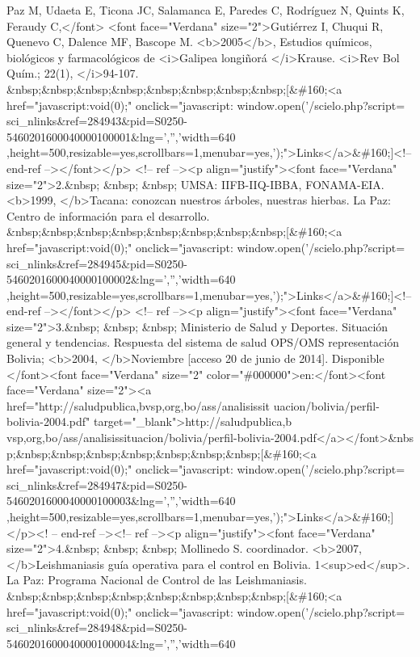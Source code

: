 Paz M, Udaeta E, Ticona JC, Salamanca E, Paredes C, Rodríguez N, Quints K,
Feraudy C,</font> <font face="Verdana" size="2">Gutiérrez I, Chuqui R, Quenevo
C, Dalence MF, Bascope M. <b>2005</b>, Estudios químicos, biológicos y
farmacológicos de <i>Galipea longiñorá </i>Krause. <i>Rev Bol Quím.; 22(1),
</i>94-107. \&nbsp;\&nbsp;\&nbsp;\&nbsp;\&nbsp;\&nbsp;\&nbsp;\&nbsp;[\&\#160;<a
href="javascript:void(0);" onclick="javascript: window.open('/scielo.php?script=
sci\_{}nlinks\&ref=284943\&pid=S0250-5460201600040000100001\&lng=','','width=640
,height=500,resizable=yes,scrollbars=1,menubar=yes,');">Links</a>\&\#160;]<!--
end-ref --></font></p> <!-- ref --><p align="justify"><font face="Verdana"
size="2">2.\&nbsp; \&nbsp; \&nbsp; UMSA: IIFB-IIQ-IBBA, FONAMA-EIA. <b>1999,
</b>Tacana: conozcan nuestros árboles, nuestras hierbas. La Paz: Centro de
información para el desarrollo.
\&nbsp;\&nbsp;\&nbsp;\&nbsp;\&nbsp;\&nbsp;\&nbsp;\&nbsp;[\&\#160;<a
href="javascript:void(0);" onclick="javascript: window.open('/scielo.php?script=
sci\_{}nlinks\&ref=284945\&pid=S0250-5460201600040000100002\&lng=','','width=640
,height=500,resizable=yes,scrollbars=1,menubar=yes,');">Links</a>\&\#160;]<!--
end-ref --></font></p> <!-- ref --><p align="justify"><font face="Verdana"
size="2">3.\&nbsp; \&nbsp; \&nbsp; Ministerio de Salud y Deportes. Situación
general y tendencias. Respuesta del sistema de salud OPS/OMS representación
Bolivia; <b>2004, </b>Noviembre [acceso 20 de junio de 2014]. Disponible
</font><font face="Verdana" size="2" color="\#000000">en:</font><font
face="Verdana" size="2"><a href="http://saludpublica,bvsp,org,bo/ass/analisissit
uacion/bolivia/perfil-bolivia-2004.pdf" target="\_{}blank">http://saludpublica,b
vsp,org,bo/ass/analisissituacion/bolivia/perfil-bolivia-2004.pdf</a></font>\&nbs
p;\&nbsp;\&nbsp;\&nbsp;\&nbsp;\&nbsp;\&nbsp;\&nbsp;[\&\#160;<a
href="javascript:void(0);" onclick="javascript: window.open('/scielo.php?script=
sci\_{}nlinks\&ref=284947\&pid=S0250-5460201600040000100003\&lng=','','width=640
,height=500,resizable=yes,scrollbars=1,menubar=yes,');">Links</a>\&\#160;]</p><!
-- end-ref --><!-- ref --><p align="justify"><font face="Verdana"
size="2">4.\&nbsp; \&nbsp; \&nbsp; Mollinedo S. coordinador. <b>2007,
</b>Leishmaniasis guía operativa para el control en Bolivia. 1<sup>ed</sup>. La
Paz: Programa Nacional de Control de las Leishmaniasis.
\&nbsp;\&nbsp;\&nbsp;\&nbsp;\&nbsp;\&nbsp;\&nbsp;\&nbsp;[\&\#160;<a
href="javascript:void(0);" onclick="javascript: window.open('/scielo.php?script=
sci\_{}nlinks\&ref=284948\&pid=S0250-5460201600040000100004\&lng=','','width=640
